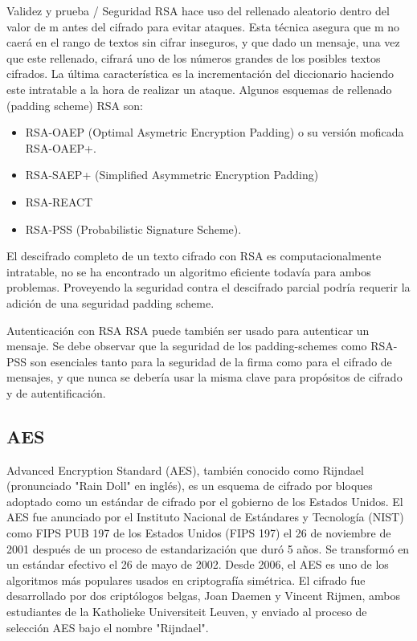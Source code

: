 \documentclass[spanish]{article}
\begin{document}
Validez y prueba / Seguridad
RSA hace uso del rellenado aleatorio dentro del valor de m antes del cifrado para evitar ataques. Esta técnica asegura que m no caerá en el rango de textos sin cifrar inseguros, y que dado un mensaje, una vez que este rellenado, cifrará uno de los números grandes de los posibles textos cifrados. La última característica es la incrementación del diccionario haciendo este intratable a la hora de realizar un ataque.
Algunos esquemas de rellenado (padding scheme) RSA son:
\begin{itemize}
\item RSA-OAEP (Optimal Asymetric Encryption Padding) o su versión moficada RSA-OAEP+.
\item RSA-SAEP+ (Simplified Asymmetric Encryption Padding)
\item RSA-REACT
\item RSA-PSS (Probabilistic Signature Scheme).
\end{itemize}

El descifrado completo de un texto cifrado con RSA es computacionalmente intratable, no se ha encontrado un algoritmo eficiente todavía para ambos problemas. Proveyendo la seguridad contra el descifrado parcial podría requerir la adición de una seguridad padding scheme.


Autenticación con RSA
RSA puede también ser usado para autenticar un mensaje. Se debe observar que la seguridad de los padding-schemes como RSA-PSS son esenciales tanto para la seguridad de la firma como para el cifrado de mensajes, y que nunca se debería usar la misma clave para propósitos de cifrado y de autentificación. 


\subsection{AES}
Advanced Encryption Standard (AES), también conocido como Rijndael (pronunciado "Rain Doll" en inglés), es un esquema de cifrado por bloques adoptado como un estándar de cifrado por el gobierno de los Estados Unidos. El AES fue anunciado por el Instituto Nacional de Estándares y Tecnología (NIST) como FIPS PUB 197 de los Estados Unidos (FIPS 197) el 26 de noviembre de 2001 después de un proceso de estandarización que duró 5 años. Se transformó en un estándar efectivo el 26 de mayo de 2002. Desde 2006, el AES es uno de los algoritmos más populares usados en criptografía simétrica.
El cifrado fue desarrollado por dos criptólogos belgas, Joan Daemen y Vincent Rijmen, ambos estudiantes de la Katholieke Universiteit Leuven, y enviado al proceso de selección AES bajo el nombre "Rijndael".
\end{document}
